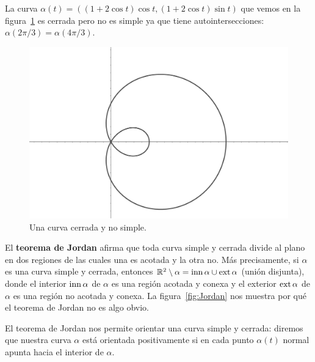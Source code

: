 \begin{example}
	La curva $\alpha(t)=( (1+2\cos t)\cos t,(1+2\cos t)\sin t)$ que vemos en la
	figura~\ref{fig:self} es cerrada pero no es simple ya que tiene
	autointersecciones: $\alpha(2\pi/3)=\alpha(4\pi/3)$. 
	\begin{figure}
		\centering
    	\includegraphics[scale=0.1]{eps/self}
		\caption{Una curva cerrada y no simple.}
		\label{fig:self}
	\end{figure}
\end{example}

El \textbf{teorema de Jordan} afirma que toda curva simple y cerrada divide al
plano en dos regiones de las cuales una es acotada y la otra no. Más
precisamente, si $\alpha$ es una curva simple y cerrada, entonces
$\mathbb{R}^2\setminus\alpha=\operatorname{inn}\alpha\cup\operatorname{ext}\alpha$ (unión disjunta), donde el
interior $\operatorname{inn}\alpha$ de $\alpha$ es una región acotada y conexa y el
exterior $\operatorname{ext}\alpha$ de $\alpha$ es una región no acotada y conexa. La figura~\ref{fig:Jordan} 
nos muestra por qué el teorema de Jordan no es algo obvio.

El teorema de Jordan nos permite orientar una curva simple y cerrada: diremos
que nuestra curva $\alpha$ está orientada positivamente si en cada punto
$\alpha(t)$ normal apunta hacia el interior de $\alpha$.

